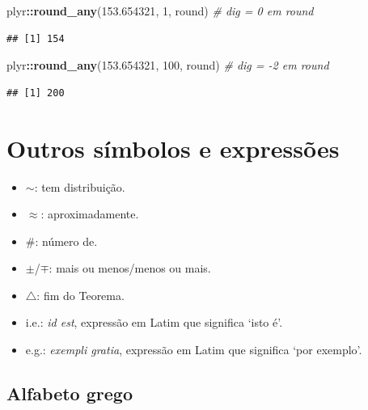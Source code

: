 \documentclass[
]{book}
\newenvironment{Shaded}{\begin{snugshade}}{\end{snugshade}}
\newcommand{\CommentTok}[1]{\textcolor[rgb]{0.56,0.35,0.01}{\textit{#1}}}
\newcommand{\DecValTok}[1]{\textcolor[rgb]{0.00,0.00,0.81}{#1}}
\newcommand{\FloatTok}[1]{\textcolor[rgb]{0.00,0.00,0.81}{#1}}
\newcommand{\KeywordTok}[1]{\textcolor[rgb]{0.13,0.29,0.53}{\textbf{#1}}}
\newcommand{\NormalTok}[1]{#1}
\newcommand{\OperatorTok}[1]{\textcolor[rgb]{0.81,0.36,0.00}{\textbf{#1}}}
\providecommand{\tightlist}{%
  \setlength{\itemsep}{0pt}\setlength{\parskip}{0pt}}
\theoremstyle{definition}
\theoremstyle{definition}
\theoremstyle{definition}
\theoremstyle{remark}
\begin{document}
\begin{Shaded}
\begin{Highlighting}[]
\NormalTok{plyr}\OperatorTok{::}\KeywordTok{round\_any}\NormalTok{(}\FloatTok{153.654321}\NormalTok{, }\DecValTok{1}\NormalTok{, round)             }\CommentTok{\# dig = 0 em round}
\end{Highlighting}
\end{Shaded}

\begin{verbatim}
## [1] 154
\end{verbatim}

\begin{Shaded}
\begin{Highlighting}[]
\NormalTok{plyr}\OperatorTok{::}\KeywordTok{round\_any}\NormalTok{(}\FloatTok{153.654321}\NormalTok{, }\DecValTok{100}\NormalTok{, round)           }\CommentTok{\# dig = {-}2 em round}
\end{Highlighting}
\end{Shaded}

\begin{verbatim}
## [1] 200
\end{verbatim}

\hypertarget{outros}{%
\section{Outros símbolos e expressões}\label{outros}}

\begin{itemize}
\tightlist
\item
  \(\sim\): tem distribuição.
\item
  \(\approx\): aproximadamente.
\item
  \#: número de.
\item
  \(\pm\)/\(\mp\): mais ou menos/menos ou mais.
\item
  \(\bigtriangleup\): fim do Teorema.
\item
  i.e.: \emph{id est}, expressão em Latim que significa `isto é'.
\item
  e.g.: \emph{exempli gratia}, expressão em Latim que significa `por exemplo'.
\end{itemize}

\hypertarget{alfabeto-grego}{%
\subsection{Alfabeto grego}\label{alfabeto-grego}}
\end{document}

